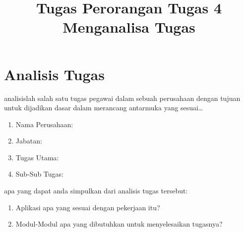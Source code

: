 \documentclass[a4paper, 12pt]{article}
\title{\textbf{Tugas Perorangan}\linebreak
\textbf{Tugas 4 Menganalisa Tugas}\linebreak}
\date{}
\begin{document}


\setcounter{page}{1}
\section{Analisis Tugas}
analisislah salah satu tugas pegawai dalam sebuah perusahaan dengan tujuan untuk dijadikan dasar dalam merancang antarmuka yang sesuai\dots
\begin{enumerate}
  \item Nama Perusahaan:
  \item Jabatan:
  \item Tugas Utama:
  \item Sub-Sub Tugas:
\end{enumerate}
apa yang dapat anda simpulkan dari analisis tugas tersebut:
\begin{enumerate}
  \item Aplikasi apa yang sesuai dengan pekerjaan itu?
  \item Modul-Modul apa yang dibutuhkan untuk menyelesaikan tugasnya?
\end{enumerate}
\end{document}
